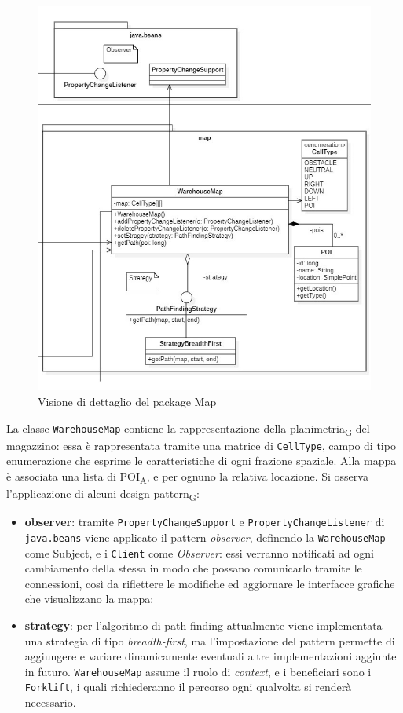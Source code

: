 \begin{figure}[H]
	\centering
	\includegraphics[scale=0.60]{res/diagrams/server/server_pack_map.jpg}
	\caption{Visione di dettaglio del package Map}
\end{figure}


La classe \texttt{WarehouseMap} contiene la rappresentazione della planimetria\textsubscript{G} del magazzino: essa è rappresentata tramite una matrice di \texttt{CellType}, campo di tipo enumerazione che esprime le caratteristiche di ogni frazione spaziale. Alla mappa è associata una lista di POI\textsubscript{A}, e per ognuno la relativa locazione.
Si osserva l'applicazione di alcuni design pattern\textsubscript{G}:
\begin{itemize}
	\item \textbf{observer}: tramite \texttt{PropertyChangeSupport} e \texttt{PropertyChangeListener} di \texttt{java.beans} viene applicato il pattern \textit{observer}, definendo la \texttt{WarehouseMap} come Subject, e i \texttt{Client} come \textit{Observer}: essi verranno notificati ad ogni cambiamento della stessa in modo che possano comunicarlo tramite le connessioni, così da riflettere le modifiche ed aggiornare le interfacce grafiche che visualizzano la mappa;
	\item \textbf{strategy}: per l’algoritmo di path finding attualmente viene implementata una strategia di tipo \textit{breadth-first}, ma l’impostazione del pattern permette di aggiungere e variare dinamicamente eventuali altre implementazioni aggiunte in futuro. \texttt{WarehouseMap} assume il ruolo di \textit{context}, e i beneficiari sono i \texttt{Forklift}, i quali richiederanno il percorso ogni qualvolta si renderà necessario.
\end{itemize}






